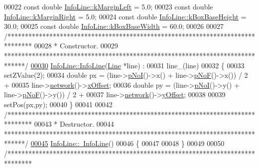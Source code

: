 \begin{DoxyCode}
00022 \textcolor{keyword}{const} \textcolor{keywordtype}{double} \hyperlink{class_info_line_a68232e6e5e3b63a4b6aced3d99291ad7}{InfoLine::kMarginLeft} = 5.0;
00023 \textcolor{keyword}{const} \textcolor{keywordtype}{double} \hyperlink{class_info_line_a0f0bd713ed9c1c8012bbd29dbd1db75e}{InfoLine::kMarginRight} = 5.0;
00024 \textcolor{keyword}{const} \textcolor{keywordtype}{double} \hyperlink{class_info_line_ab50f47aa54c45def219859e9da3755e6}{InfoLine::kBoxBaseHeight} = 30.0;
00025 \textcolor{keyword}{const} \textcolor{keywordtype}{double} \hyperlink{class_info_line_aad905589137b80ba75d9a1c49535eb1a}{InfoLine::kBoxBaseWidth} = 60.0;
00026 
00027 \textcolor{comment}{/*******************************************************************************}
00028 \textcolor{comment}{ * Constructor.}
00029 \textcolor{comment}{ ******************************************************************************/}
\hypertarget{infoline_8cpp_source_l00030}{}\hyperlink{class_info_line_a63819dbfeb257cc86be86f0fac3aa02f}{00030} \hyperlink{class_info_line_a63819dbfeb257cc86be86f0fac3aa02f}{InfoLine::InfoLine}(\hyperlink{class_line}{Line} *line) :
00031   line\_(line)
00032 \{
00033   setZValue(2);
00034   \textcolor{keywordtype}{double} px = (line->\hyperlink{group___models_gaeafd90e84ac2f8de2a879abe9e53eef3}{pNoI}()->x() + line->\hyperlink{group___models_gabbc73ddedd3075c33ae5331bd7c9829f}{pNoF}()->x()) / 2 +
00035               line->\hyperlink{group___models_gaa4cfa330c9c53ddaf86c8f5c17ba1ee0}{network}()->\hyperlink{class_network_a9f5c70be28a45320802bd0ac3947d114}{xOffset};
00036   \textcolor{keywordtype}{double} py = (line->\hyperlink{group___models_gaeafd90e84ac2f8de2a879abe9e53eef3}{pNoI}()->y() + line->\hyperlink{group___models_gabbc73ddedd3075c33ae5331bd7c9829f}{pNoF}()->y()) / 2 +
00037               line->\hyperlink{group___models_gaa4cfa330c9c53ddaf86c8f5c17ba1ee0}{network}()->\hyperlink{class_network_a771b16f7eb4459d0ca7141c048b1ab59}{yOffset};
00038 
00039   setPos(px,py);
00040 \}
00041 
00042 \textcolor{comment}{/*******************************************************************************}
00043 \textcolor{comment}{ * Destructor.}
00044 \textcolor{comment}{ ******************************************************************************/}
\hypertarget{infoline_8cpp_source_l00045}{}\hyperlink{class_info_line_ac3497eeb5f2719fb4fac42434955597d}{00045} \hyperlink{class_info_line_ac3497eeb5f2719fb4fac42434955597d}{InfoLine::~InfoLine}()
00046 \{
00047 
00048 \}
00049 
00050 \textcolor{comment}{/*******************************************************************************}

\end{DoxyCode}

